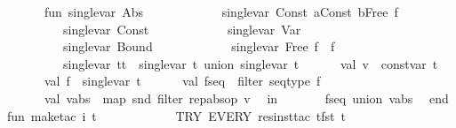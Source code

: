 \begin{isabellebody}
\ \ \ \ \ \ fun\ single{\isacharunderscore}var\ {\isacharparenleft}Abs\ {\isacharunderscore}{\isacharparenright}\ {\isacharequal}\ {\isacharbrackleft}{\isacharbrackright}\isanewline
\ \ \ \ \ \ \ \ {\isacharbar}\ single{\isacharunderscore}var\ {\isacharparenleft}{\isacharparenleft}Const\ a{\isacharparenright}{\isachardollar}{\isacharparenleft}Const\ b{\isacharparenright}{\isachardollar}{\isacharparenleft}Free\ f{\isacharparenright}{\isacharparenright}\ {\isacharequal}\ {\isacharbrackleft}{\isacharbrackright}\isanewline
\ \ \ \ \ \ \ \ {\isacharbar}\ single{\isacharunderscore}var\ {\isacharparenleft}Const\ {\isacharunderscore}{\isacharparenright}\ {\isacharequal}\ {\isacharbrackleft}{\isacharbrackright}\isanewline
\ \ \ \ \ \ \ \ {\isacharbar}\ single{\isacharunderscore}var\ {\isacharparenleft}Var\ {\isacharunderscore}{\isacharparenright}\ {\isacharequal}\ {\isacharbrackleft}{\isacharbrackright}\isanewline
\ \ \ \ \ \ \ \ {\isacharbar}\ single{\isacharunderscore}var\ {\isacharparenleft}Bound\ {\isacharunderscore}{\isacharparenright}\ {\isacharequal}\ {\isacharbrackleft}{\isacharbrackright}\isanewline
\ \ \ \ \ \ \ \ {\isacharbar}\ single{\isacharunderscore}var\ {\isacharparenleft}Free\ f{\isacharparenright}\ {\isacharequal}\ {\isacharbrackleft}f{\isacharbrackright}\isanewline
\ \ \ \ \ \ \ \ {\isacharbar}\ single{\isacharunderscore}var\ {\isacharparenleft}t{}{\isachardollar}t{}{\isacharparenright}\ {\isacharequal}\ {\isacharparenleft}single{\isacharunderscore}var\ t{}{\isacharparenright}\ union\ {\isacharparenleft}single{\isacharunderscore}var\ t{}{\isacharparenright}\isanewline
\ \ \ \ \ \ val\ v\ {\isacharequal}\ {\isacharparenleft}const{\isacharunderscore}var\ t{\isacharparenright}\isanewline
\ \ \ \ \ \ val\ f\ {\isacharequal}\ {\isacharparenleft}single{\isacharunderscore}var\ t{\isacharparenright}\isanewline
\ \ \ \ \ \ val\ f{\isacharunderscore}seq\ {\isacharequal}\ {\isacharparenleft}filter\ seq{\isacharunderscore}type\ f{\isacharparenright}\isanewline
\ \ \ \ \ \ val\ v{\isacharunderscore}abs\ {\isacharequal}\ {\isacharparenleft}map\ snd\ {\isacharparenleft}filter\ rep{\isacharunderscore}abs{\isacharunderscore}op\ v{\isacharparenright}{\isacharparenright}\isanewline
\ \ in\ \isanewline
\ \ \ \ \ \ f{\isacharunderscore}seq\ union\ v{\isacharunderscore}abs\isanewline
\ \ end\isanewline
\isanewline
fun\ make{\isacharunderscore}tac\ i\ t\ {\isacharequal}\ \isanewline
\ \ \ \ \ \ \ \ \ \ {\isacharparenleft}TRY\ {\isacharparenleft}EVERY\ {\isacharbrackleft}{\isacharparenleft}res{\isacharunderscore}inst{\isacharunderscore}tac\ {\isacharbrackleft}{\isacharparenleft}{\isachardoublequote}t{\isachardoublequote}{\isacharcomma}fst\ t{\isacharparenright}{\isacharbrackright}\ \isanewline

\end{isabellebody}

